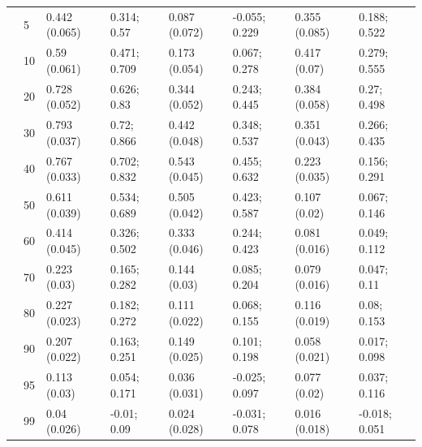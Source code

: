\begin{landscape}
\begin{table}
{\begin{tabular}[t]{llllllll}
 & 5 & 0.442 (0.065) & 0.314; 0.57 & 0.087 (0.072) & -0.055; 0.229 & 0.355 (0.085) & 0.188; 0.522\\
 & 10 & 0.59 (0.061) & 0.471; 0.709 & 0.173 (0.054) & 0.067; 0.278 & 0.417 (0.07) & 0.279; 0.555\\
 & 20 & 0.728 (0.052) & 0.626; 0.83 & 0.344 (0.052) & 0.243; 0.445 & 0.384 (0.058) & 0.27; 0.498\\
 & 30 & 0.793 (0.037) & 0.72; 0.866 & 0.442 (0.048) & 0.348; 0.537 & 0.351 (0.043) & 0.266; 0.435\\
 & 40 & 0.767 (0.033) & 0.702; 0.832 & 0.543 (0.045) & 0.455; 0.632 & 0.223 (0.035) & 0.156; 0.291\\
 & 50 & 0.611 (0.039) & 0.534; 0.689 & 0.505 (0.042) & 0.423; 0.587 & 0.107 (0.02) & 0.067; 0.146\\
 & 60 & 0.414 (0.045) & 0.326; 0.502 & 0.333 (0.046) & 0.244; 0.423 & 0.081 (0.016) & 0.049; 0.112\\
 & 70 & 0.223 (0.03) & 0.165; 0.282 & 0.144 (0.03) & 0.085; 0.204 & 0.079 (0.016) & 0.047; 0.11\\
 & 80 & 0.227 (0.023) & 0.182; 0.272 & 0.111 (0.022) & 0.068; 0.155 & 0.116 (0.019) & 0.08; 0.153\\
 & 90 & 0.207 (0.022) & 0.163; 0.251 & 0.149 (0.025) & 0.101; 0.198 & 0.058 (0.021) & 0.017; 0.098\\
 & 95 & 0.113 (0.03) & 0.054; 0.171 & 0.036 (0.031) & -0.025; 0.097 & 0.077 (0.02) & 0.037; 0.116\\
 & 99 & 0.04 (0.026) & -0.01; 0.09 & 0.024 (0.028) & -0.031; 0.078 & 0.016 (0.018) & -0.018; 0.051\\
\bottomrule
\end{tabular}}
\end{table}
\end{landscape}
